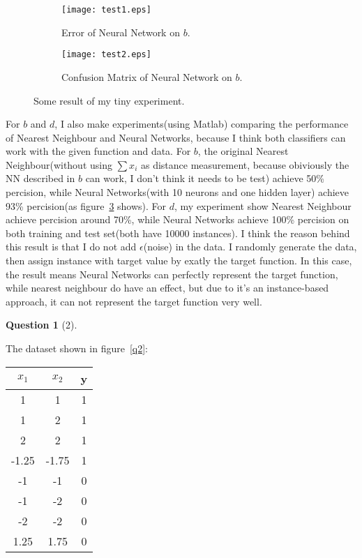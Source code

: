 \documentclass{article}
\theoremstyle{quest}
\newtheorem*{question}{Question}
\begin{document}
\begin{enumerate}[a.]
\begin{figure}
	\centering
	\begin{subfigure}[hb]{0.7\textwidth}
		\texttt{[image: test1.eps]}
		\caption{Error of Neural Network on $b$.}
		\label{fig:10-0}
	\end{subfigure}
	\hfill
	\begin{subfigure}[hb]{0.7\textwidth}
		\texttt{[image: test2.eps]}
		\caption{Confusion Matrix of Neural Network on $b$.}
		\label{fig:10-2}
	\end{subfigure}
	\caption{Some result of my tiny experiment.}\label{f11}
\end{figure}
For $b$ and $d$, I also make experiments(using Matlab) comparing the performance of Nearest Neighbour and Neural Networks, because I think both classifiers can work with the given function and data. For $b$, the original Nearest Neighbour(without using $\sum x_i$ as distance measurement, because obiviously the NN described in $b$ can work, I don't  think it needs to be test) achieve 50\% percision, while Neural Networks(with 10 neurons and one hidden layer) achieve 93\% percision(as figure~\ref{f11} shows). For $d$, my experiment show Nearest Neighbour achieve percision around 70\%, while Neural Networks achieve 100\% percision on both training and test set(both have 10000 instances). I think the reason behind this result is that I do not add $\epsilon$(noise) in the data. I randomly generate the data, then assign instance with target value by exatly the target function. In this case, the result means Neural Networks can perfectly represent the target function, while nearest neighbour do have an effect, but due to it's an instance-based approach, it can not represent the target function very well.

\end{enumerate}
\begin{question}[2]
\end{question}
The dataset shown in figure~\ref{q2}:\\
\begin{center}
\begin{tabular}{c|c|c} \hline
$x_1$ & $x_2$ & y \\ \hline
1 & 1 & 1 \\ 
1 & 2 & 1 \\ 
2 & 2 & 1 \\ 
-1.25 & -1.75 & 1 \\ 
-1 & -1 & 0 \\ 
-1 & -2 & 0 \\ 
-2 & -2 & 0 \\ 
1.25 & 1.75 & 0 \\ \hline
\end{tabular}
\end{center}
\end{document}

